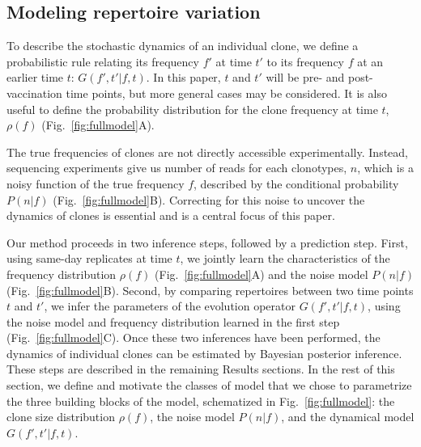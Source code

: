 \subsection*{Modeling repertoire variation}

To describe the stochastic dynamics of an individual clone, we define a probabilistic rule relating its frequency $f'$ at time $t'$ to its frequency $f$ at an earlier time $t$: $G(f',t'|f,t)$. In this paper, $t$ and $t'$ will be pre- and post-vaccination time points, but more general cases may be considered.
It is also useful to define the probability distribution for the clone frequency at time $t$, $\rho(f)$ (Fig.~\ref{fig:fullmodel}A).

The true frequencies of clones are not directly accessible experimentally. Instead, sequencing experiments give us number of reads for each clonotypes, $n$, which is a noisy function of the true frequency $f$, described by the conditional probability $P(n|f)$ (Fig.~\ref{fig:fullmodel}B). Correcting for this noise to uncover the dynamics of clones is essential and is a central focus of this paper.

Our method proceeds in two inference steps, followed by a prediction step. First, using same-day replicates at time $t$, we jointly learn the characteristics of the frequency distribution $\rho(f)$  (Fig.~\ref{fig:fullmodel}A) and the noise model $P(n|f)$ (Fig.~\ref{fig:fullmodel}B). Second, by comparing repertoires between two time points $t$ and $t'$, we infer the parameters of the evolution operator $G(f',t'|f,t)$, using the noise model and frequency distribution learned in the first step (Fig.~\ref{fig:fullmodel}C). Once these two inferences have been performed, the dynamics of individual clones can be estimated by Bayesian posterior inference. These steps are described in the remaining Results sections. In the rest of this section, we define and motivate the classes of model that we chose to parametrize the three building blocks of the model, schematized in Fig.~\ref{fig:fullmodel}: the clone size distribution $\rho(f)$, the noise model $P(n|f)$, and the dynamical model $G(f',t'|f,t)$.

